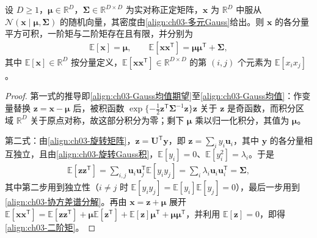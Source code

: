 \documentclass[../../main.tex]{subfiles}
\begin{document}
\begin{proposition}\label{proposition:ch03-Gauss矩}
设 $D\geqslant1$，$\boldsymbol{\mu}\in\mathbb{R}^{D}$，$\boldsymbol{\Sigma}\in\mathbb{R}^{D\times D}$ 为实对称正定矩阵，$\boldsymbol{x}$ 为 $\mathbb{R}^{D}$ 中服从 $\mathcal{N}(\boldsymbol{x}\mid\boldsymbol{\mu},\boldsymbol{\Sigma})$ 的随机向量，其密度由\eqref{align:ch03-多元Gauss}给出。则 $\boldsymbol{x}$ 的各分量平方可积，一阶矩与二阶矩存在且有限，并分别为
\begin{align*}
\mathbb{E}[\boldsymbol{x}]=\boldsymbol{\mu},\qquad \mathbb{E}[\boldsymbol{x}\boldsymbol{x}^{\mathsf{T}}]=\boldsymbol{\mu}\boldsymbol{\mu}^{\mathsf{T}}+\boldsymbol{\Sigma},
\end{align*}
其中 $\mathbb{E}[\boldsymbol{x}]\in\mathbb{R}^{D}$ 按分量定义，$\mathbb{E}[\boldsymbol{x}\boldsymbol{x}^{\mathsf{T}}]\in\mathbb{R}^{D\times D}$ 的第 $(i,j)$ 个元素为 $\mathbb{E}[x_ix_j]$。
\end{proposition}
\begin{proof}
第一式的推导即\eqref{align:ch03-Gauss均值期望}至\eqref{align:ch03-Gauss均值}：作变量替换 $\boldsymbol{z}=\boldsymbol{x}-\boldsymbol{\mu}$ 后，被积函数 $\exp\{-\frac12\boldsymbol{z}^{\mathsf{T}}\boldsymbol{\Sigma}^{-1}\boldsymbol{z}\}\boldsymbol{z}$ 关于 $\boldsymbol{z}$ 是奇函数，而积分区域 $\mathbb{R}^{D}$ 关于原点对称，故这部分积分为零；剩下 $\boldsymbol{\mu}$ 乘以归一化积分，其值为 $\boldsymbol{\mu}$。

第二式：由\eqref{align:ch03-旋转矩阵}，$\boldsymbol{z}=\boldsymbol{U}^{\mathsf{T}}\boldsymbol{y}$，即 $\boldsymbol{z}=\sum_i y_i\boldsymbol{u}_i$，其中 $\boldsymbol{y}$ 的各分量相互独立，且由\eqref{align:ch03-旋转Gauss积}，$\mathbb{E}[y_i]=0$、$\mathbb{E}[y_i^{2}]=\lambda_i$。于是
\begin{align*}
\mathbb{E}[\boldsymbol{z}\boldsymbol{z}^{\mathsf{T}}]=\sum_{i,j}\boldsymbol{u}_i\boldsymbol{u}_j^{\mathsf{T}}\mathbb{E}[y_iy_j]=\sum_{i}\lambda_i\boldsymbol{u}_i\boldsymbol{u}_i^{\mathsf{T}}=\boldsymbol{\Sigma},
\end{align*}
其中第二步用到独立性（$i\neq j$ 时 $\mathbb{E}[y_iy_j]=\mathbb{E}[y_i]\mathbb{E}[y_j]=0$），最后一步用到\eqref{align:ch03-协方差谱分解}。再由 $\boldsymbol{x}=\boldsymbol{z}+\boldsymbol{\mu}$ 展开 $\mathbb{E}[\boldsymbol{x}\boldsymbol{x}^{\mathsf{T}}]=\mathbb{E}[\boldsymbol{z}\boldsymbol{z}^{\mathsf{T}}]+\boldsymbol{\mu}\mathbb{E}[\boldsymbol{z}^{\mathsf{T}}]+\mathbb{E}[\boldsymbol{z}]\boldsymbol{\mu}^{\mathsf{T}}+\boldsymbol{\mu}\boldsymbol{\mu}^{\mathsf{T}}$，并利用 $\mathbb{E}[\boldsymbol{z}]=0$，即得\eqref{align:ch03-二阶矩}。
\end{proof}
\end{document}
